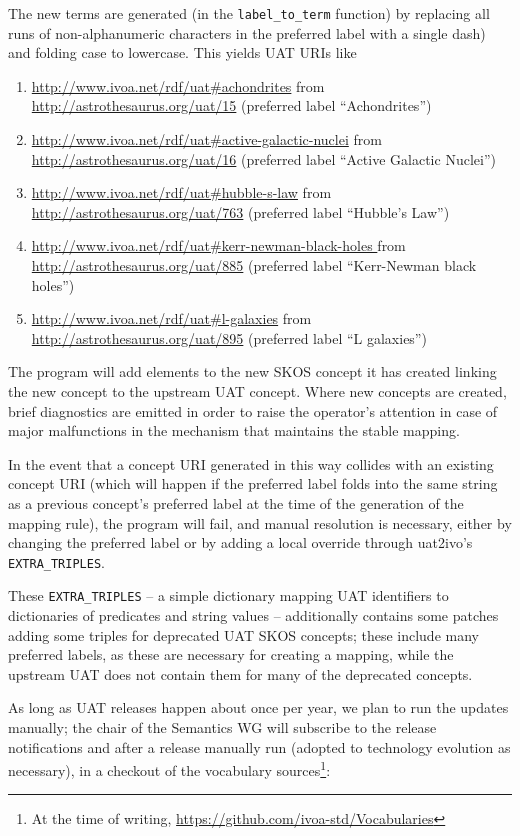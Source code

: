 \documentclass[11pt,a4paper]{ivoa}
\begin{document}
The new terms are generated (in the \verb|label_to_term| function) by
replacing all runs of non-alphanumeric characters in the preferred label
with a single dash) and folding case to lowercase.  This yields UAT URIs
like

\begin{enumerate}
\raggedright
\item \url{http://www.ivoa.net/rdf/uat#achondrites} from
\url{http://astrothesaurus.org/uat/15} (preferred label ``Achondrites'')
\item \url{http://www.ivoa.net/rdf/uat#active-galactic-nuclei}
from \url{http://astrothesaurus.org/uat/16} (preferred label ``Active
Galactic Nuclei'')
\item \url{http://www.ivoa.net/rdf/uat#hubble-s-law}
from \url{http://astrothesaurus.org/uat/763} (preferred label ``Hubble's
Law'')
\item \url{http://www.ivoa.net/rdf/uat#kerr-newman-black-holes }
from \url{http://astrothesaurus.org/uat/885} (preferred label
``Kerr-Newman black holes'')
\item \url{http://www.ivoa.net/rdf/uat#l-galaxies} from
\url{http://astrothesaurus.org/uat/895} (preferred label ``L galaxies'')
\end{enumerate}

The program will add  elements to the new
SKOS concept it has created linking the new concept to the upstream UAT
concept.  Where new concepts are created, brief diagnostics are emitted
in order to raise the operator's attention in case of major malfunctions
in the mechanism that maintains the stable mapping.

In the event that a concept URI generated in this way collides with an
existing concept URI (which will happen if the preferred label folds
into the same string as a previous concept's preferred label at the time
of the generation of the mapping rule), the program will fail, and
manual resolution is necessary, either by changing the preferred label
or by adding a local override through uat2ivo's \verb|EXTRA_TRIPLES|.

These \verb|EXTRA_TRIPLES| -- a simple dictionary mapping UAT
identifiers to dictionaries of predicates and string values --
additionally contains some patches adding some triples for deprecated
UAT SKOS concepts; these include many preferred labels, as these are
necessary for creating a mapping, while the upstream UAT does not contain
them for many of the deprecated concepts.

As long as UAT releases happen about once per year, we plan to run the
updates manually; the chair of the Semantics WG will subscribe to the
release notifications and after a release manually run (adopted to
technology evolution as necessary), in a checkout of the vocabulary
sources\footnote{At the time of writing, 
\url{https://github.com/ivoa-std/Vocabularies}}:
\end{document}
